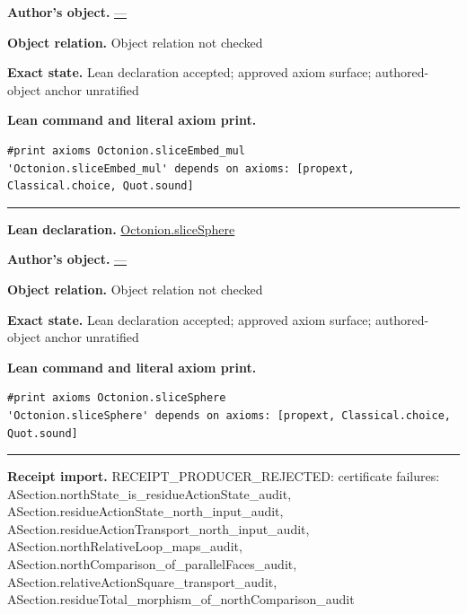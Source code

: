 \documentclass[11pt]{article}
\theoremstyle{plain}
\theoremstyle{definition}
\theoremstyle{remark}
\begin{document}
\begin{tcolorbox}[provenancecard,title={11. Definition - Complex slices and slice Riemann spheres},title after break={11. Definition - Complex slices and slice Riemann spheres (continued)}]
\par\textbf{Author's object.} \url{—}
\par\textbf{Object relation.} Object relation not checked
\par\textbf{Exact state.} Lean declaration accepted; approved axiom surface; authored-object anchor unratified
\par\smallskip\textbf{Lean command and literal axiom print.}
\begin{Verbatim}[breaklines=true,breakanywhere=true,fontsize=\small]
#print axioms Octonion.sliceEmbed_mul
'Octonion.sliceEmbed_mul' depends on axioms: [propext, Classical.choice, Quot.sound]
\end{Verbatim}
\medskip\hrule\medskip
\textbf{Lean declaration.} \url{Octonion.sliceSphere}
\par\textbf{Author's object.} \url{—}
\par\textbf{Object relation.} Object relation not checked
\par\textbf{Exact state.} Lean declaration accepted; approved axiom surface; authored-object anchor unratified
\par\smallskip\textbf{Lean command and literal axiom print.}
\begin{Verbatim}[breaklines=true,breakanywhere=true,fontsize=\small]
#print axioms Octonion.sliceSphere
'Octonion.sliceSphere' depends on axioms: [propext, Classical.choice, Quot.sound]
\end{Verbatim}
\medskip\hrule\medskip
\textbf{Receipt import.} \textcolor{KgtRed}{RECEIPT\_PRODUCER\_REJECTED: certificate failures: ASection.northState\_is\_residueActionState\_audit, ASection.residueActionState\_north\_input\_audit, ASection.residueActionTransport\_north\_input\_audit, ASection.northRelativeLoop\_maps\_audit, ASection.northComparison\_of\_parallelFaces\_audit, ASection.relativeActionSquare\_transport\_audit, ASection.residueTotal\_morphism\_of\_northComparison\_audit}
\end{tcolorbox}
\medskip
\end{document}
